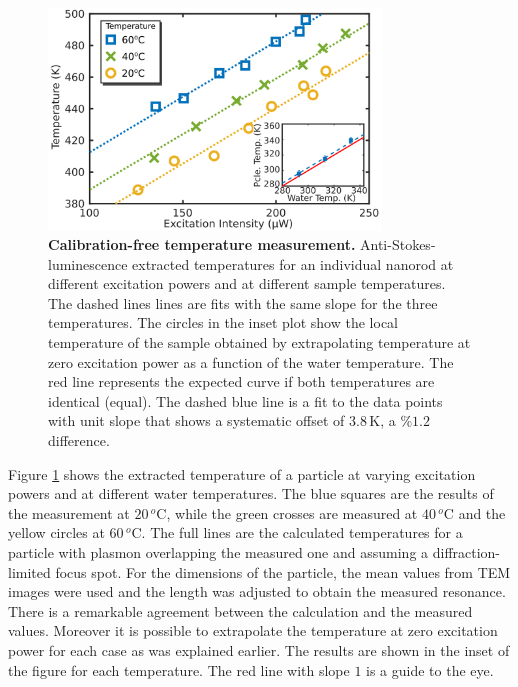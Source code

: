 \documentclass[journal=nalefd,manuscript=letter]{achemso}
\newcommand{\K}{\ensuremath{\,\textrm{K}}}
\newcommand{\degree}{\ensuremath{\,^o\textrm{C}}}
\begin{document}
\begin{figure}[tp] \centering
\includegraphics[width=88.4mm]{Figures/03_Fit_Of_AS/03_Log_Fit_AS_02.png}
\caption{\textbf{Calibration-free temperature measurement.}
Anti-Stokes-luminescence extracted temperatures for an individual nanorod
at different excitation powers and at different sample temperatures. 
The dashed lines lines are fits with the same slope for the three temperatures. 
The circles in the inset plot show the local temperature of the sample obtained
by extrapolating temperature at zero excitation power as a function of the water temperature.
The red line represents the expected curve if both temperatures are identical (equal). The dashed blue
line is a fit to the data points with unit slope that shows a systematic offset of $3.8\K$, a $\%1.2$ difference.}
	\label{fig:AS_temp}
\end{figure}


Figure \ref{fig:AS_temp} shows the extracted temperature of a particle at
varying excitation powers and at different water temperatures. The blue squares
are the results of the measurement at $20\degree$, while the green crosses are measured
at $40\degree$ and the yellow circles at $60\degree$. The full lines are the
calculated temperatures for a particle with plasmon overlapping the measured one
and assuming a diffraction-limited focus spot. For the dimensions of the
particle, the mean values from TEM images were used and the length was adjusted
to obtain the measured resonance. There is a remarkable agreement between the
calculation and the measured values. Moreover it is possible to extrapolate the
temperature at zero excitation power for each case as was explained earlier. The
results are shown in the inset of the figure for each temperature. The red line
with slope $1$ is a guide to the eye.
\end{document}
